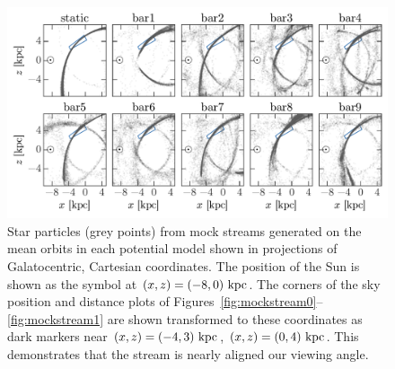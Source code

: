 \documentclass[numberedappendix]{emulateapj}
\begin{document}
\begin{figure}[p]
\begin{center}
\includegraphics[width=\textwidth]{figures/mockstream-xyz}
\caption{ Star particles (grey points) from mock streams generated on the mean orbits in each potential model shown in projections of Galatocentric, Cartesian coordinates. The position of the Sun is shown as the symbol at $(x,z)=(-8,0)~{\rm kpc}$. The corners of the sky position and distance plots of Figures~\ref{fig:mockstream0}--\ref{fig:mockstream1} are shown transformed to these coordinates as dark markers near $(x,z)=(-4,3)~{\rm kpc}$, $(x,z)=(0,4)~{\rm kpc}$. This demonstrates that the stream is nearly aligned our viewing angle. }
\label{fig:mockstreamxyz}
\end{center}
\end{figure}





\appendix
\end{document}
